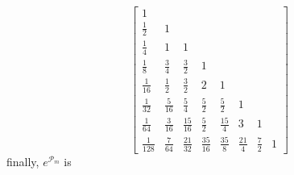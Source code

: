 \begin{displaymath}
\left[\begin{matrix}1 &   &   &   &   &   &   &  \\\frac{1}{2} & 1 &   &   &   &   &   &  \\\frac{1}{4} & 1 & 1 &   &   &   &   &  \\\frac{1}{8} & \frac{3}{4} & \frac{3}{2} & 1 &   &   &   &  \\\frac{1}{16} & \frac{1}{2} & \frac{3}{2} & 2 & 1 &   &   &  \\\frac{1}{32} & \frac{5}{16} & \frac{5}{4} & \frac{5}{2} & \frac{5}{2} & 1 &   &  \\\frac{1}{64} & \frac{3}{16} & \frac{15}{16} & \frac{5}{2} & \frac{15}{4} & 3 & 1 &  \\\frac{1}{128} & \frac{7}{64} & \frac{21}{32} & \frac{35}{16} & \frac{35}{8} & \frac{21}{4} & \frac{7}{2} & 1\end{matrix}\right]
\end{displaymath}
finally, $e^{\mathcal{P}_{m}}$ is
